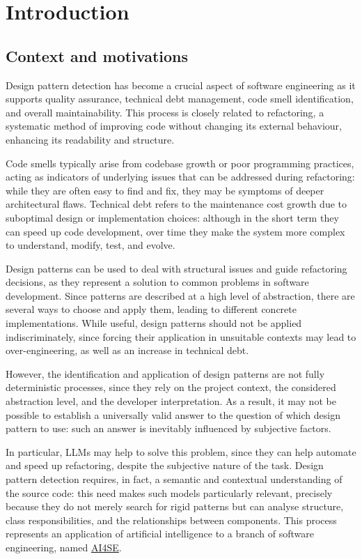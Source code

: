 \chapter{Introduction}
\label{ch:introduction}

\section{Context and motivations}\label{sec:context-and-motivations}
Design pattern detection has become a crucial aspect of software engineering as it supports quality assurance,
technical debt management, code smell identification, and overall maintainability.
This process is closely related to refactoring, a systematic method of improving code without changing its
external behaviour, enhancing its readability and structure.

Code smells typically arise from codebase growth or poor programming practices, acting as indicators of
underlying issues that can be addressed during refactoring: while they are often easy to find and fix, they may be
symptoms of deeper architectural flaws.
Technical debt refers to the maintenance cost growth due to suboptimal design or implementation choices: although in the
short term they can speed up code development, over time they make the system more complex to understand, modify, test,
and evolve.

Design patterns can be used to deal with structural issues and guide refactoring decisions, as they represent
a solution to common problems in software development.
Since patterns are described at a high level of abstraction, there are several ways to choose and apply them, leading to
different concrete implementations.
While useful, design patterns should not be applied indiscriminately, since forcing their application in unsuitable
contexts may lead to over-engineering, as well as an increase in technical debt.

However, the identification and application of design patterns are not fully deterministic processes, since they rely on
the project context, the considered abstraction level, and the developer interpretation.
As a result, it may not be possible to establish a universally valid answer to the question of which design pattern to
use: such an answer is inevitably influenced by subjective factors.

In particular, LLMs may help to solve this problem, since they can help automate and speed up refactoring, despite
the subjective nature of the task.
Design pattern detection requires, in fact, a semantic and contextual understanding of the source code: this need makes
such models particularly relevant, precisely because they do not merely search for rigid patterns but can analyse
structure, class responsibilities, and the relationships between components.
This process represents an application of artificial intelligence to a branch of software engineering, named
\underline{AI4SE}.

